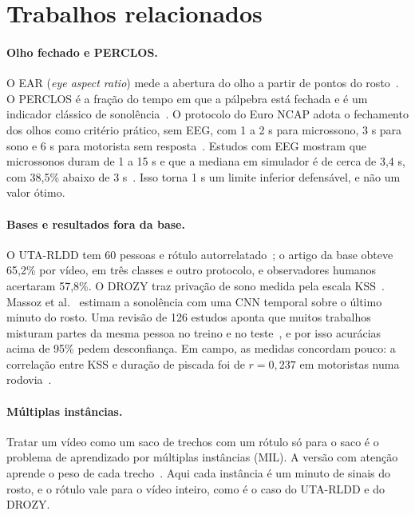 \documentclass[11pt,a4paper]{article}
\begin{document}
\section{Trabalhos relacionados}
\label{sec:rel}

\paragraph{Olho fechado e PERCLOS.} O EAR (\emph{eye aspect ratio}) mede a abertura do olho a partir de pontos do rosto~\cite{soukupova2016}. O PERCLOS é a fração do tempo em que a pálpebra está fechada e é um indicador clássico de sonolência~\cite{dinges1998}. O protocolo do Euro NCAP adota o fechamento dos olhos como critério prático, sem EEG, com 1 a 2 s para microssono, 3 s para sono e 6 s para motorista sem resposta~\cite{euroncap}. Estudos com EEG mostram que microssonos duram de 1 a 15 s e que a mediana em simulador é de cerca de 3,4 s, com 38,5\% abaixo de 3 s~\cite{skorucak2020,boyle2008}. Isso torna 1 s um limite inferior defensável, e não um valor ótimo.

\paragraph{Bases e resultados fora da base.} O UTA-RLDD tem 60 pessoas e rótulo autorrelatado~\cite{ghoddoosian2019}; o artigo da base obteve 65,2\% por vídeo, em três classes e outro protocolo, e observadores humanos acertaram 57,8\%. O DROZY traz privação de sono medida pela escala KSS~\cite{massoz2016}. Massoz et al.~\cite{massoz2018} estimam a sonolência com uma CNN temporal sobre o último minuto do rosto. Uma revisão de 126 estudos aponta que muitos trabalhos misturam partes da mesma pessoa no treino e no teste~\cite{revisao126}, e por isso acurácias acima de 95\% pedem desconfiança. Em campo, as medidas concordam pouco: a correlação entre KSS e duração de piscada foi de $r = 0{,}237$ em motoristas numa rodovia~\cite{anund2013}.

\paragraph{Múltiplas instâncias.} Tratar um vídeo como um saco de trechos com um rótulo só para o saco é o problema de aprendizado por múltiplas instâncias (MIL). A versão com atenção aprende o peso de cada trecho~\cite{ilse2018}. Aqui cada instância é um minuto de sinais do rosto, e o rótulo vale para o vídeo inteiro, como é o caso do UTA-RLDD e do DROZY.
\end{document}
